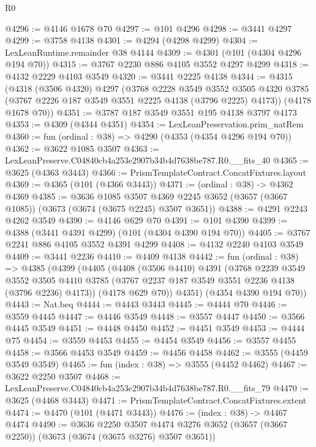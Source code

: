 \begin{lexlean}{R0}
\begin{coremodule}
@4296 := @4146 @1678 @70
@4297 := @101 @4296
@4298 := @3441 @4297
@4299 := @3758 @4138
@4301 := @4294 (@4298 @4299)
@4304 := LexLeanRuntime.remainder @38 @4144
@4309 := @4301 (@101 (@4304 @4296 @194 @70))
@4315 := @3767 @2230 @886 @4105 @3552 @4297 @4299
@4318 := @4132 @2229 @4103 @3549
@4320 := @3441 @2225 @4138
@4344 := @4315
    (@4318
      (@3506 @4320)
      @4297
      (@3768
        @2228
        @3549
        @3552
        @3505
        @4320
        @3785
        (@3767 @2226 @187 @3549 @3551 @2225 @4138 (@3796 @2225) @4173))
      (@4178 @1678 @70))
@4351 := @3787 @187 @3549 @3551 @195 @4138 @3797 @4173
@4353 := @4309 (@4344 @4351)
@4354 := LexLeanPreservation.prim_natRem
@4360 := fun (ordinal : @38) => @4290 (@4353 (@4354 @4296 @194 @70))
@4362 := @3622 @1085 @3507
@4363 := LexLeanPreserve.C04840cb4a253e2907b34b4d7638be787.R0.__fits_40
@4365 := @3625 (@4363 @3443)
@4366 := PrismTemplateContract.ConcatFixtures.layout
@4369 := @4365 (@101 (@4366 @3443))
@4371 := (ordinal : @38) -> @4362 @4369
@4385 := @3636
    @1085
    @3507
    @4369
    @2245
    @3652
    (@3657 (@3667 @1085))
    (@3673 (@3674 (@3675 @2245) @3507 @3651))
@4388 := @4291 @2243 @4262 @3549
@4390 := @4146 @629 @70
@4391 := @101 @4390
@4399 := @4388 (@3441 @4391 @4299) (@101 (@4304 @4390 @194 @70))
@4405 := @3767 @2241 @886 @4105 @3552 @4391 @4299
@4408 := @4132 @2240 @4103 @3549
@4409 := @3441 @2236
@4410 := @4409 @4138
@4442 := fun (ordinal : @38) =>
  @4385
    (@4399
      (@4405
        (@4408
          (@3506 @4410)
          @4391
          (@3768
            @2239
            @3549
            @3552
            @3505
            @4410
            @3785
            (@3767 @2237 @187 @3549 @3551 @2236 @4138 (@3796 @2236) @4173))
          (@4178 @629 @70))
        @4351)
      (@4354 @4390 @194 @70))
@4443 := Nat.beq
@4444 := @4443 @3443
@4445 := @4444 @70
@4446 := @3559 @4445
@4447 := @4446 @3549
@4448 := @3557 @4447
@4450 := @3566 @4445 @3549
@4451 := @4448 @4450
@4452 := @4451 @3549
@4453 := @4444 @75
@4454 := @3559 @4453
@4455 := @4454 @3549
@4456 := @3557 @4455
@4458 := @3566 @4453 @3549
@4459 := @4456 @4458
@4462 := @3555 (@4459 @3549 @3549)
@4465 := fun (index : @38) => @3555 (@4452 @4462)
@4467 := @3622 @2250 @3507
@4468 := LexLeanPreserve.C04840cb4a253e2907b34b4d7638be787.R0.__fits_79
@4470 := @3625 (@4468 @3443)
@4471 := PrismTemplateContract.ConcatFixtures.extent
@4474 := @4470 (@101 (@4471 @3443))
@4476 := (index : @38) -> @4467 @4474
@4490 := @3636
    @2250
    @3507
    @4474
    @3276
    @3652
    (@3657 (@3667 @2250))
    (@3673 (@3674 (@3675 @3276) @3507 @3651))

\end{coremodule}
\end{lexlean}
